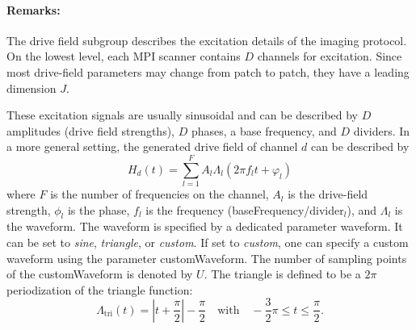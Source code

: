 \documentclass[landscape,a4paper]{article} %
\newcommand{\inlvar}[1]{{\ttfamily#1}}
\begin{document}
\begin{multicols}{2}
\paragraph{Remarks:} The drive field subgroup describes the excitation details of the imaging protocol. On the lowest level, each MPI scanner contains $D$ channels for excitation. Since most drive-field parameters may change from patch to patch, they have a leading dimension $J$.

These excitation signals are usually sinusoidal and can be described by $D$ amplitudes (drive field strengths), $D$ phases, a base frequency, and $D$ dividers. In a more general setting, the generated drive field of channel $d$ can be described by
$$
H_d(t) = \sum_{l=1}^{F} A_l \Lambda_l (2\pi f_l t + \varphi_l)
$$
where $F$ is the number of frequencies on the channel, $A_l$ is the drive-field strength, $\phi_l$ is the phase, $f_l$ is the frequency (\inlvar{baseFrequency}/\inlvar{divider}$_l$), and $\Lambda_l$ is the waveform. The waveform is specified by a dedicated parameter \inlvar{waveform}. It can be set to \textit{sine}, \textit{triangle}, or \textit{custom}. If set to \textit{custom}, one can specify a custom waveform using the parameter \inlvar{customWaveform}. The number of sampling points of the \inlvar{customWaveform} is denoted by $U$. The triangle is defined to be a $2\pi$ periodization of the
triangle function:
$$
 \Lambda_\text{tri}(t) = \left\vert t+\frac{\pi}{2}\right\vert - \frac{\pi}{2} \quad \text{with} \quad -\frac{3}{2}\pi\leq t \leq \frac{\pi}{2}.
$$
\end{multicols}
\end{document}
